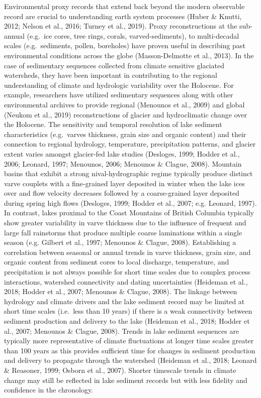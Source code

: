 \documentclass[
  letterpaper,
  DIV=11,
  numbers=noendperiod]{scrartcl}
\begin{document}
Environmental proxy records that extend back beyond the modern
observable record are crucial to understanding earth system processes
(Huber \& Knutti, 2012; Nelson et al., 2016; Turney et al., 2019). Proxy
reconstructions at the sub-annual (e.g.~ice cores, tree rings, corals,
varved-sediments), to multi-decadal scales (e.g.~sediments, pollen,
boreholes) have proven useful in describing past environmental
conditions across the globe (Masson-Delmotte et al., 2013). In the case
of sedimentary sequences collected from climate sensitive glaciated
watersheds, they have been important in contributing to the regional
understanding of climate and hydrologic variability over the Holocene.
For example, researchers have utilized sedimentary sequences along with
other environmental archives to provide regional (Menounos et al., 2009)
and global (Neukom et al., 2019) reconstructions of glacier and
hydroclimatic change over the Holocene. The sensitivity and temporal
resolution of lake sediment characteristics (e.g.~varves thickness,
grain size and organic content) and their connection to regional
hydrology, temperature, precipitation patterns, and glacier extent
varies amongst glacier-fed lake studies (Desloges, 1999; Hodder et al.,
2006; Leonard, 1997; Menounos, 2006; Menounos \& Clague, 2008). Mountain
basins that exhibit a strong nival-hydrographic regime typically produce
distinct varve couplets with a fine-grained layer deposited in winter
when the lake ices over and flow velocity decreases followed by a
coarse-grained layer deposited during spring high flows (Desloges, 1999;
Hodder et al., 2007; e.g. Leonard, 1997). In contrast, lakes proximal to
the Coast Mountains of British Columbia typically show greater
variability in varve thickness due to the influence of frequent and
large fall rainstorms that produce multiple coarse laminations within a
single season (e.g. Gilbert et al., 1997; Menounos \& Clague, 2008).
Establishing a correlation between seasonal or annual trends in varve
thickness, grain size, and organic content from sediment cores to local
discharge, temperature, and precipitation is not always possible for
short time scales due to complex process interactions, watershed
connectivity and dating uncertainties (Heideman et al., 2018; Hodder et
al., 2007; Menounos \& Clague, 2008). The linkage between hydrology and
climate drivers and the lake sediment record may be limited at short
time scales (i.e.~less than 10 years) if there is a weak connectivity
between sediment production and delivery to the lake (Heideman et al.,
2018; Hodder et al., 2007; Menounos \& Clague, 2008). Trends in lake
sediment sequences are typically more representative of climate
fluctuations at longer time scales greater than 100 years as this
provides sufficient time for changes in sediment production and delivery
to propagate through the watershed (Heideman et al., 2018; Leonard \&
Reasoner, 1999; Osborn et al., 2007). Shorter timescale trends in
climate change may still be reflected in lake sediment records but with
less fidelity and confidence in the chronology.
\end{document}
